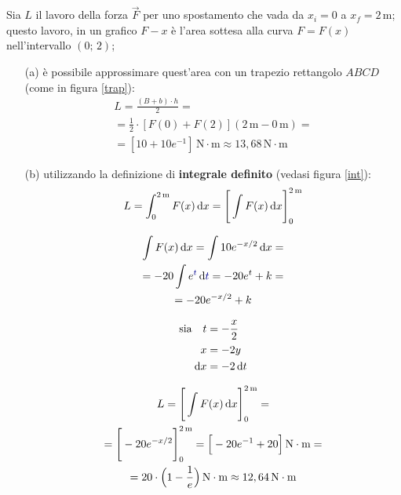 \documentclass[a4paper, oneside, titlepage, reqno]{book}
\begin{document}
Sia $L$ il lavoro della forza $\vec{F}$ per uno spostamento che vada da $x_i=0$ a $x_f=2\,\text{m}$; questo lavoro, in un grafico $F-x$ è l'area sottesa alla curva $F=F(x)$ nell'intervallo $(0;\,2)$;
\begin{itemize}
\item[(a)] \label{L:a} è possibile approssimare quest'area con un trapezio rettangolo $ABCD$ (come in figura \ref{trap}):
\begin{multline*}
L=\frac{(B+b)\cdot h}{2}=\\=\frac{1}{2}\cdot [F(0)+F(2)](2\,\text{m}-0\,\text{m})=\\=[10+10e^{-1}]\,\text{N}\cdot\text{m}\approx 13,68\,\text{N}\cdot\text{m}
\end{multline*}
\item [(b)] \label{L:b} utilizzando la definizione di \textbf{integrale definito} (vedasi figura \ref{int}):
\[
L=\int_{0}^{2\,\text{m}}F(x)\dif x=\Bigg[\int F(x) \dif x\Bigg]^{2\,\text{m}}_{0}
\]

\begin{minipage}{\textwidth}
\begin{tcolorbox}[colframe=blue!0!, colback=blue!3!, top=0mm, bottom=0mm]
\begin{multicols}{2}
\begin{gather*}
\int F(x) \dif x=\int 10e^{-x/2}\dif x=\\
=-20\int e^{\textcolor{blue}{t}}\dif \textcolor{blue}{t}=-20e^t+k=\\
=-20e^{-x/2}+k
\end{gather*}
\columnbreak

\begin{align*}
\text{sia}\quad t&=-\frac{x}{2}\\
x&=-2y\\
\dif x &= -2\dif t
\end{align*}
\end{multicols}
\end{tcolorbox}
\end{minipage}
\begin{multline*}
L=\Bigg[\int F(x) \dif x\Bigg]^{2\,\text{m}}_{0}=\\
=\Bigg[-20e^{-x/2}\Bigg]^{2\,\text{m}}_{0}=\Big[-20e^{-1}+20\Big]\,\text{N}\cdot\text{m}=\\
=20\cdot\Big(1-\frac{1}{e}\Big)\,\text{N}\cdot\text{m}\approx 12,64\,\text{N}\cdot\text{m}
\end{multline*}
\end{itemize}
\end{document}
